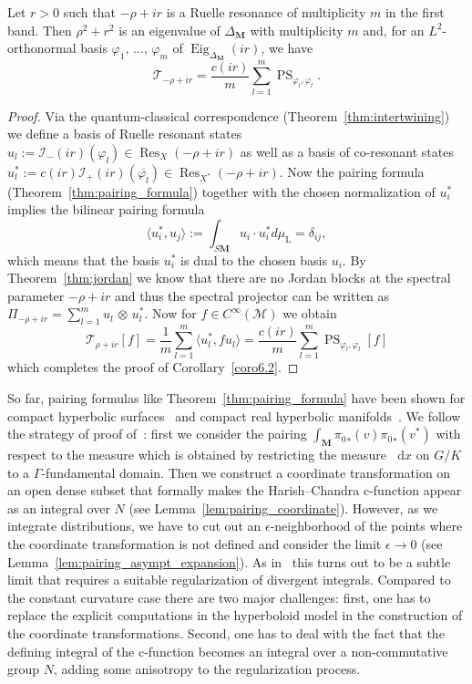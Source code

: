 \documentclass[AHL, Unicode, longabstracts, published]{cedram}
\DeclareMathOperator{\Res}{Res}
\DeclareMathOperator{\Eig}{Eig}
\newcommand{\rml}{\mathrm{L}}
\newcommand{\bfm}{\mathbf{M}}
\newcommand{\cjd}{\rangle}
\newcommand{\cjg}{\langle}
\newcommand{\intd}{\mathop{}\!\mathrm{d}}
\begin{document}
\begin{coro}\label{coro6.2}
Let $r>0$ such that $-\rho+ir$ is a Ruelle resonance of multiplicity $m$ in the first band. Then $\rho^2+r^2$ is an eigenvalue of $\Delta_{\bfm}$ with multiplicity $m$ and, for an $L^2$-orthonormal basis $\varphi_1,\,\ldots,\,\varphi_m$ of $\Eig_{\Delta_{\mathbf M}}(ir)$, we have
\[
\mathcal T_{-\rho+ir} = \frac{c(ir)}{m} \sum_{l=1}^m \operatorname{PS}_{\varphi_l, \varphi_l}.
\]
\end{coro}

\begin{proof}
Via the quantum-classical correspondence (Theorem~\ref{thm:intertwining}) we define a basis of Ruelle resonant states $u_l:= \mathcal I_-(ir)(\varphi_{l}) \in \Res_{X}(-\rho+ir)$ as well as a basis of co-resonant states $u_l^*:= c(ir) \mathcal I_+(ir)(\overline{\varphi_{l}})\in
\Res_{X^*}(-\rho+ir)$. Now the pairing formula (Theorem~\ref{thm:pairing_formula}) together with the chosen normalization of $u_i^*$ implies the bilinear pairing formula
\[
\cjg u_i^*,u_j\cjd := \int_{S\mathbf M} u_i\cdot u_i^* d\mu_{\rml} = \delta_{ij},
\]
which means that the basis $u_i^*$ is dual to the chosen basis $u_i$. By Theorem~\ref{thm:jordan} we know that there are no Jordan blocks at the spectral parameter $-\rho+ir$ and thus the spectral projector can be written as $\Pi_{-\rho+ir} = \sum_{l=1}^{m} u_l\,\otimes\,u_l^*$. Now for $f\in C^{\infty}(\mathcal M)$ we obtain
\[
\mathcal T_{\rho+ir}[f] = \frac{1}{m} \sum_{l=1}^{m} \cjg u_l^*,f u_l\cjd = \frac{c(ir)}{m}\sum_{l=1}^{m} \operatorname{PS}_{\varphi_{l}, \varphi_{l}}[f]
\]
which completes the proof of Corollary~\ref{coro6.2}.
\end{proof}

So far, pairing formulas like Theorem~\ref{thm:pairing_formula} have been shown for compact hyperbolic surfaces~\cite[Theorem~1.2]{AZ07} and compact real hyperbolic manifolds~\cite[Lemma~5.10]{DFG15}. We follow the strategy of proof of~\cite{DFG15}: first we consider the pairing $\int_{\mathbf M} {\pi_0}_*(v){\pi_0}_*(v^*)$ with respect to the measure which is obtained by restricting the measure $\intd x$ on $G/K$ to a $\Gamma$-fundamental domain. Then we construct a coordinate transformation on an open dense subset that formally makes the Harish--Chandra c-function appear as an integral over $N$ (see Lemma~\ref{lem:pairing_coordinate}). However, as we integrate distributions, we have to cut out an $\epsilon$-neighborhood of the points where the coordinate transformation is not defined and consider the limit $\epsilon\to 0$ (see Lemma~\ref{lem:pairing_asympt_expansion}). As in~\cite{DFG15} this turns out to be a subtle limit that requires a suitable regularization of divergent integrals. Compared to the constant curvature case there are two major challenges: first, one has to replace the explicit computations in the hyperboloid model in the construction of the coordinate transformations. Second, one has to deal with the fact that the defining integral of the c-function becomes an integral over a non-commutative group $N$, adding some anisotropy to the regularization process.
\end{document}
